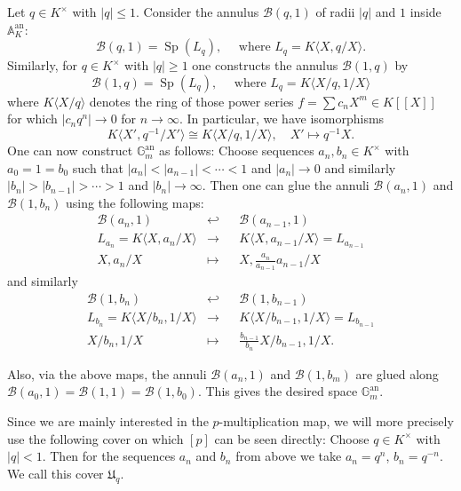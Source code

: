 \documentclass[10pt,oneside]{amsart}
\theoremstyle{definition}
\theoremstyle{remark}
\begin{document}
	Let $q \in K^\times$ with $|q|\leq 1$. Consider the annulus $\mathcal B(q,1)$ of radii $|q|$ and $1$ inside $\mathbb A_K^{\operatorname{an}}$:
	\[\mathcal B(q,1) = \operatorname{Sp}(L_q),\quad \text{ where } L_q = K\langle X,q/X\rangle. \]
	Similarly, for $q\in K^\times$ with $|q|\geq 1$ one constructs the annulus $\mathcal B(1,q)$ by
	\[\mathcal B(1,q) = \operatorname{Sp}(L_{q}),\quad \text{ where } L_{q} = K\langle X/q,1/X\rangle\]
	where $K\langle X/q\rangle$ denotes the ring of those power series $f=\sum c_nX^m\in K[[X]]$ for which $|c_nq^n|\to 0$ for $n\to \infty$. In particular, we have isomorphisms
	 \[K\langle X',q^{-1}/X'\rangle\cong K\langle X/q,1/X\rangle,\quad X'\mapsto q^{-1}X.\]
	One can now construct $\mathbb G_m^{\operatorname{an}}$ as follows: Choose sequences $a_n,b_n\in K^\times$ with $a_0=1=b_0$ such that $|a_n|<|a_{n-1}|<\cdots<1$ and $|a_n| \to 0$ and similarly $|b_n|>|b_{n-1}|>\cdots>1$ and $|b_n| \to \infty$. Then one can glue the annuli $\mathcal B(a_n,1)$ and $\mathcal B(1,b_n)$ using the following maps:
	\begin{equation}\label{torus explicit cover glue map 1}
	\begin{alignedat}{2}
	\mathcal B(a_{n},1)&\hookleftarrow&& \mathcal B(a_{n-1},1)\\
	L_{a_n}=K\langle X,a_n/X\rangle&\rightarrow &&K\langle X,a_{n-1}/X\rangle=L_{a_{n-1}}\\
	X,a_{n}/X&\mapsto&& X, \frac{a_{n}}{a_{n-1}}a_{n-1}/X
	\end{alignedat}
	\end{equation}
	and similarly 
	\begin{equation}\label{torus explicit cover glue map 2}
	\begin{alignedat}{2}
	\mathcal B(1,b_n)&\hookleftarrow&& \mathcal B(1,b_{n-1})\\
	L_{b_n}=K\langle  X/b_{n},1/X\rangle&\rightarrow &&K\langle X/b_{n-1},1/X\rangle=L_{b_{n-1}}\\
	X/b_{n},1/X&\mapsto&& \frac{b_{n-1}}{b_{n}} X/b_{n-1}, 1/X.
	\end{alignedat}
	\end{equation}
	
	Also, via the above maps, the annuli $\mathcal B(a_n,1)$ and $\mathcal B(1,b_m)$ are glued along $\mathcal B(a_0,1)=\mathcal B(1,1)=\mathcal B(1,b_0).$ This gives the desired space $\mathbb{G}_m^{\operatorname{an}}$.
	
	Since we are mainly interested in the $p$-multiplication map, we will more precisely use the following cover on which $[p]$ can be seen directly: Choose $q\in K^\times$ with $|q|<1$. Then for the sequences $a_n$ and $b_n$ from above we take $a_n = q^n$, $b_n = q^{-n}$. 
	We call this cover $\mathfrak U_q$.
	
\end{document}
